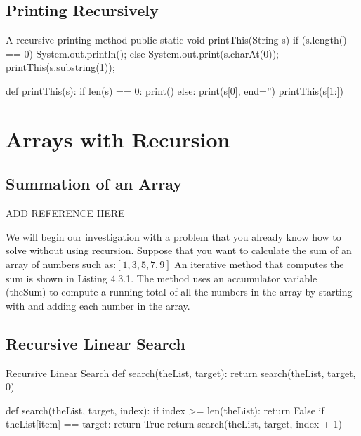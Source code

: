 \subsection{Printing Recursively}

\begin{javacode}{A recursive printing method}
public static void printThis(String s){
	if (s.length() == 0) {
		System.out.println();
	} else {
		System.out.print(s.charAt(0));
		printThis(s.substring(1));
	}
}
\end{javacode}

\begin{pycode}
def printThis(s):
	if len(s) == 0:
		print()
	else:
		print(s[0], end='')
		printThis(s[1:])
\end{pycode}


\section{Arrays with Recursion}


\subsection{Summation of an Array}
ADD REFERENCE HERE


We will begin our investigation with a problem that you already know how to solve without using recursion. Suppose that you want to calculate the sum of an array of numbers such as:$[1, 3, 5, 7, 9]$ An iterative method that computes the sum is shown in Listing 4.3.1. The method uses an accumulator variable (theSum) to compute a running total of all the numbers in the array by starting with and adding each number in the array.



\subsection{Recursive Linear Search}




\begin{pycode}{Recursive Linear Search}
def search(theList, target):
	return search(theList, target, 0)


def search(theList, target, index):
	if index >= len(theList):
		return False 
	if theList[item] == target:
		return True
	return search(theList, target, index + 1)
	
\end{pycode}




